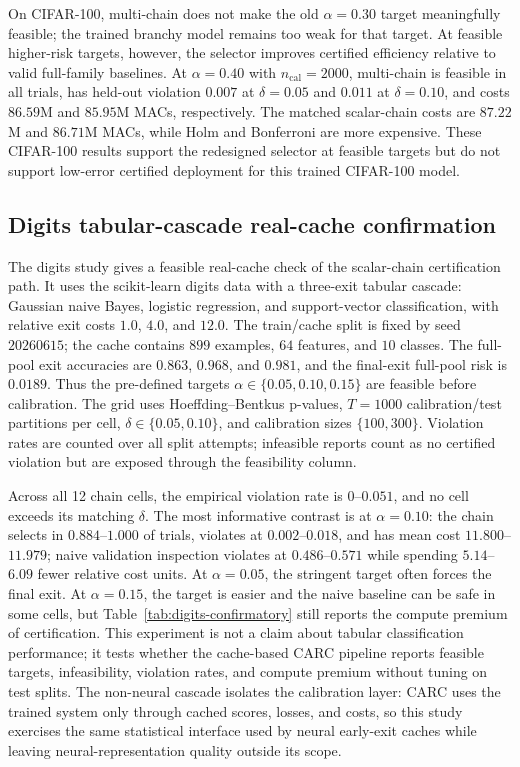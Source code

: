 \documentclass{ieeeaccess}
\begin{document}
On CIFAR-100, multi-chain does not make the old $\alpha=0.30$ target meaningfully feasible; the trained branchy model remains too weak for that target. At feasible higher-risk targets, however, the selector improves certified efficiency relative to valid full-family baselines. At $\alpha=0.40$ with $n_{\mathrm{cal}}=2000$, multi-chain is feasible in all trials, has held-out violation $0.007$ at $\delta=0.05$ and $0.011$ at $\delta=0.10$, and costs $86.59$M and $85.95$M MACs, respectively. The matched scalar-chain costs are $87.22$M and $86.71$M MACs, while Holm and Bonferroni are more expensive. These CIFAR-100 results support the redesigned selector at feasible targets but do not support low-error certified deployment for this trained CIFAR-100 model.

\subsection{Digits tabular-cascade real-cache confirmation}

The digits study gives a feasible real-cache check of the scalar-chain certification path. It uses the scikit-learn digits data with a three-exit tabular cascade: Gaussian naive Bayes, logistic regression, and support-vector classification, with relative exit costs $1.0$, $4.0$, and $12.0$. The train/cache split is fixed by seed $20260615$; the cache contains $899$ examples, $64$ features, and $10$ classes. The full-pool exit accuracies are $0.863$, $0.968$, and $0.981$, and the final-exit full-pool risk is $0.0189$. Thus the pre-defined targets $\alpha\in\{0.05,0.10,0.15\}$ are feasible before calibration. The grid uses Hoeffding--Bentkus p-values, $T=1000$ calibration/test partitions per cell, $\delta\in\{0.05,0.10\}$, and calibration sizes $\{100,300\}$. Violation rates are counted over all split attempts; infeasible reports count as no certified violation but are exposed through the feasibility column.

Across all 12 chain cells, the empirical violation rate is $0$--$0.051$, and no cell exceeds its matching $\delta$. The most informative contrast is at $\alpha=0.10$: the chain selects in $0.884$--$1.000$ of trials, violates at $0.002$--$0.018$, and has mean cost $11.800$--$11.979$; naive validation inspection violates at $0.486$--$0.571$ while spending $5.14$--$6.09$ fewer relative cost units. At $\alpha=0.05$, the stringent target often forces the final exit. At $\alpha=0.15$, the target is easier and the naive baseline can be safe in some cells, but Table~\ref{tab:digits-confirmatory} still reports the compute premium of certification. This experiment is not a claim about tabular classification performance; it tests whether the cache-based CARC pipeline reports feasible targets, infeasibility, violation rates, and compute premium without tuning on test splits. The non-neural cascade isolates the calibration layer: CARC uses the trained system only through cached scores, losses, and costs, so this study exercises the same statistical interface used by neural early-exit caches while leaving neural-representation quality outside its scope.
\end{document}
